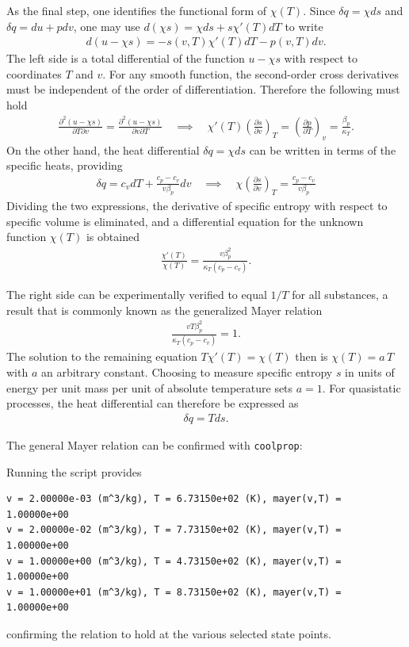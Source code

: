 As the final step, one identifies the functional form of $\chi(T)$. Since $\delta q=\chi ds$ and $\delta q=du+pdv$, one may use $d(\chi s)=\chi ds+s\chi'(T)dT$ to write
\begin{align}
    d(u-\chi s)=-s(v,T)\chi'(T)dT-p(v,T)dv.
\end{align}
The left side is a total differential of the function $u-\chi s$ with respect to coordinates $T$ and $v$. For any smooth function, the second-order cross derivatives must be independent of the order of differentiation. Therefore the following must hold
\begin{align}
    \frac{\partial^2(u-\chi s)}{\partial T\partial v}=\frac{\partial^2(u-\chi s)}{\partial v\partial T} \quad \implies \quad
    \chi'(T)\left(\frac{\partial s}{\partial v}\right)_T=\left(\frac{\partial p}{\partial T}\right)_v=\frac{\beta_p}{\kappa_T}.
\end{align}
On the other hand, the heat differential $\delta q=\chi ds$ can be written in terms of the specific heats, providing
\begin{align}
    \delta q=c_vdT+\frac{c_p-c_v}{v\beta_p}dv \quad\implies \quad \chi\left(\frac{\partial s}{\partial v}\right)_T=\frac{c_p-c_v}{v\beta_p}
\end{align}
Dividing the two expressions, the derivative of specific entropy with respect to specific volume is eliminated, and a differential equation for the unknown function $\chi(T)$ is obtained
\begin{align}
    \frac{\chi'(T)}{\chi(T)}=\frac{v\beta_p^2}{\kappa_T(c_p-c_v)}.
\end{align}

The right side can be experimentally verified to equal $1/T$ for all substances, a result that is commonly known as the generalized Mayer relation
\begin{align}\label{eq:mayer-relation}
    \frac{vT\beta_p^2}{\kappa_T(c_p-c_v)}=1.
\end{align} 
The solution to the remaining equation $T\chi'(T)=\chi(T)$ then is $\chi(T)=a\,T$ with $a$ an arbitrary constant. Choosing to measure specific entropy $s$ in units of energy per unit mass per unit of absolute temperature sets $a=1$. For quasistatic processes, the heat differential can therefore be expressed as
\begin{align}
    \delta q=Tds.
\end{align}
\begin{example}
    The general Mayer relation can be confirmed with \verb|coolprop|:
    
    Running the script provides
    \begin{Verbatim}
v = 2.00000e-03 (m^3/kg), T = 6.73150e+02 (K), mayer(v,T) = 1.00000e+00
v = 2.00000e-02 (m^3/kg), T = 7.73150e+02 (K), mayer(v,T) = 1.00000e+00
v = 1.00000e+00 (m^3/kg), T = 4.73150e+02 (K), mayer(v,T) = 1.00000e+00
v = 1.00000e+01 (m^3/kg), T = 8.73150e+02 (K), mayer(v,T) = 1.00000e+00    
    \end{Verbatim}
    confirming the relation to hold at the various selected state points.
\end{example}

